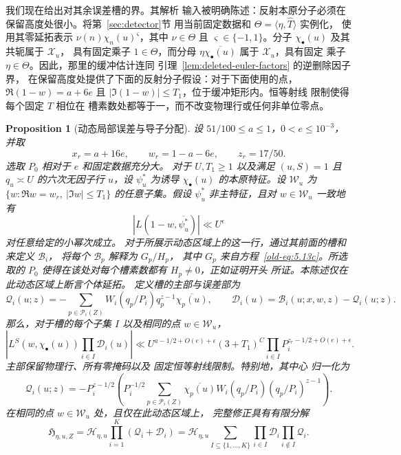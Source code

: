 \documentclass[11pt,a4paper]{article}
\numberwithin{equation}{section}
\numberwithin{figure}{section}
\newtheorem{proposition}[theorem]{Proposition}
\theoremstyle{definition}
\theoremstyle{remark}
\begin{document}
我们现在给出对其余误差槽的界。其解析
输入被明确陈述：反射本原分子必须在保留高度处很小。将第~\ref{sec:detector}节
用当前固定数据和 $\Theta=\langle\eta,\widehat T\rangle$ 实例化，
使用其零延拓表示 $\nu(n)\chi_n(u)^\varsigma$，其中
$\nu\in\Theta$ 且 $\varsigma\in\{-1,1\}$。分子 $\chi_\bullet(u)$ 及其共轭属于 $\mathcal X_u$，
具有固定乘子 $1\in\Theta$，而分母
$\eta\overline{\chi_\bullet(u)}$ 属于 $\mathcal X_u$，具有固定
乘子 $\eta\in\Theta$。因此，那里的缓冲估计连同
引理~\ref{lem:deleted-euler-factors} 的逆删除因子界，
在保留高度处提供了下面的反射分子假设：对于下面使用的点，$\Re(1-w)=a+6e$ 且
$|\Im(1-w)|\le T_1$，位于缓冲矩形内。恒等射线
限制使得每个固定 $T$ 相位在
槽素数处都等于一，而不改变物理行或任何非单位零点。\begin{proposition}[动态局部误差与导子分配]
\label{prop:probe-errors}
设 $51/100\le a\le1$，$0<e\le10^{-3}$，并取
\[
 x_r=a+16e,\qquad w_r=1-a-6e,\qquad z_r=17/50.
\]
选取 $P_0$ 相对于 $e$ 和固定数据充分大。
对于 $U,T_1\ge1$ 以及满足 $(u,S)=1$
且 $q_u\asymp U$ 的六次无因子行 $u$，设 $\psi_u^*$
为诱导 $\chi_\bullet(u)$ 的本原特征。设
$\mathcal W_u$ 为
$\{w:\Re w=w_r,\ |\Im w|\le T_1\}$ 的任意子集。假设 $\psi_u^*$
非主特征，且对 $w\in\mathcal W_u$ 一致地有
\[
 |L(1-w,\overline{\psi_u^*})|\ll U^\epsilon
\]
对任意给定的小幂次成立。
对于所展示动态区域上的这一行，通过其前面的槽和来定义 \(\mathcal B_i\)，
将每个 \(\mathcal B_p\) 解释为 \(G_p/H_p\)，
其中 \(G_p\) 来自方程~\eqref{old-eq:5.13c}。所选取的
\(P_0\) 使得在该处对每个槽素数都有 \(H_p\ne0\)，正如证明开头
所证。本陈述仅在此动态区域上断言个体延拓。
定义槽的主部与误差部为
\[
 \mathcal Q_i(u;z)=
       -\sum_{p\in\mathcal P_i(Z)}W_i(q_p/P_i)q_p^{z-1}\overline{\chi_p(u)},
 \qquad
 \mathcal D_i(u)=\mathcal B_i(u;x,w,z)-\mathcal Q_i(u;z).
\]
那么，对于槽的每个子集 $I$ 以及相同的点 $w\in\mathcal W_u$，
\begin{equation}\label{old-eq:5.13e}
 \left|L^S(w,\chi_\bullet(u))\prod_{i\in I}\mathcal D_i(u)\right|
 \ll U^{a-1/2+O(e)+\epsilon}(3+T_1)^C
       \prod_{i\in I}P_i^{z_r-1/2+O(e)+\epsilon}.
\end{equation}
主部保留物理行、所有零掩码以及
固定恒等射线限制。特别地，其中心
归一化为
\[
 \mathcal Q_i(u;z)=-P_i^{z-1/2}
       \left(P_i^{-1/2}\sum_{p\in\mathcal P_i(Z)}
          \overline{\chi_p(u)}W_i(q_p/P_i)(q_p/P_i)^{z-1}\right).
\]
在相同的点 $w\in\mathcal W_u$ 处，且仅在此动态区域上，
完整修正具有有限分解
\begin{equation}\label{eq:dynamic-compensated-decomposition}
 \mathfrak H_{\eta,u,Z}
 =\mathcal H_{\eta,u}\prod_{i=1}^K(\mathcal Q_i+\mathcal D_i)
 =\mathcal H_{\eta,u}
   \sum_{I\subseteq\{1,\ldots,K\}}
       \prod_{i\in I}\mathcal D_i\prod_{i\notin I}\mathcal Q_i.
\end{equation}
\end{proposition}
\end{document}
